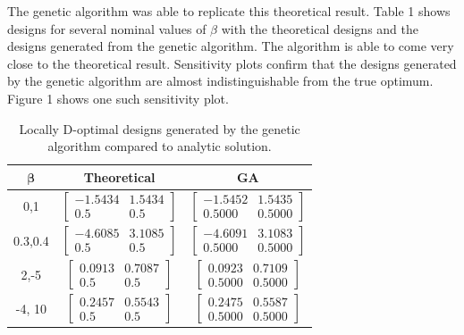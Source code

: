 \documentclass[11pt,a4paper]{article}
\begin{document}
The genetic algorithm was able to replicate this theoretical result. Table 1 shows designs for several nominal values of $\beta$ with the theoretical designs and the designs generated from the genetic algorithm. The algorithm is able to come very close to the theoretical result. Sensitivity plots confirm that the designs generated by the genetic algorithm are almost indistinguishable from the true optimum. Figure 1 shows one such sensitivity plot.
\begin{table}[ht]
\centering
\begin{tabular}{|c|c|c|}
\hline 
$\mathbf{\beta}$ & \textbf{Theoretical} & \textbf{GA} \\ 
\hline 
0,1 & $\begin{bmatrix}
-1.5434 & 1.5434\\ 0.5 & 0.5
\end{bmatrix}$  & $\begin{bmatrix}
-1.5452 & 1.5435\\ 0.5000 & 0.5000
\end{bmatrix}$ \\ 
\hline 
0.3,0.4 & $\begin{bmatrix}
-4.6085 & 3.1085\\ 0.5 & 0.5
\end{bmatrix}$  & $\begin{bmatrix}
-4.6091 & 3.1083\\ 0.5000 & 0.5000
\end{bmatrix}$ \\ 
\hline 
2,-5 & $\begin{bmatrix}
0.0913 & 0.7087\\ 0.5 & 0.5
\end{bmatrix}$  & $\begin{bmatrix}
0.0923 & 0.7109\\ 0.5000 & 0.5000
\end{bmatrix}$  \\ 
\hline
-4, 10 & $\begin{bmatrix}
0.2457 & 0.5543\\ 0.5 & 0.5
\end{bmatrix}$  & $\begin{bmatrix}
0.2475 & 0.5587\\ 0.5000 & 0.5000
\end{bmatrix}$\\
\hline 

\end{tabular} 
\caption{Locally D-optimal designs generated by the genetic algorithm compared to analytic solution.}
\end{table}
\end{document}
